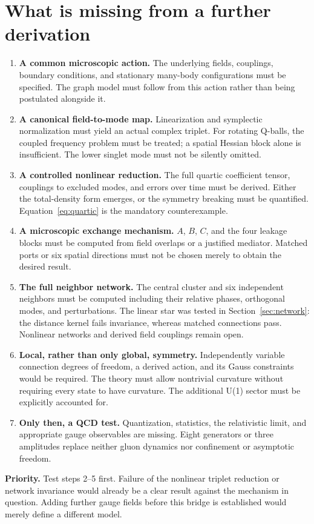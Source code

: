 \documentclass[a4paper,11pt]{article}
\begin{document}
\section{What is missing from a further derivation}\label{sec:missing}
\begin{enumerate}
\item \textbf{A common microscopic action.}
The underlying fields, couplings, boundary conditions, and stationary many-body configurations must be specified. The graph model must follow from this action rather than being postulated alongside it.
\item \textbf{A canonical field-to-mode map.}
Linearization and symplectic normalization must yield an actual complex triplet. For rotating Q-balls, the coupled frequency problem must be treated; a spatial Hessian block alone is insufficient. The lower singlet mode must not be silently omitted.
\item \textbf{A controlled nonlinear reduction.}
The full quartic coefficient tensor, couplings to excluded modes, and errors over time must be derived. Either the total-density form emerges, or the symmetry breaking must be quantified. Equation~\eqref{eq:quartic} is the mandatory counterexample.
\item \textbf{A microscopic exchange mechanism.}
$A$, $B$, $C$, and the four leakage blocks must be computed from field overlaps or a justified mediator. Matched ports or six spatial directions must not be chosen merely to obtain the desired result.
\item \textbf{The full neighbor network.}
The central cluster and six independent neighbors must be computed including their relative phases, orthogonal modes, and perturbations. The linear star was tested in Section~\ref{sec:network}: the distance kernel fails invariance, whereas matched connections pass. Nonlinear networks and derived field couplings remain open.
\item \textbf{Local, rather than only global, symmetry.}
Independently variable connection degrees of freedom, a derived action, and its Gauss constraints would be required. The theory must allow nontrivial curvature without requiring every state to have curvature. The additional U(1) sector must be explicitly accounted for.
\item \textbf{Only then, a QCD test.}
Quantization, statistics, the relativistic limit, and appropriate gauge observables are missing. Eight generators or three amplitudes replace neither gluon dynamics nor confinement or asymptotic freedom.
\end{enumerate}
\textbf{Priority.} Test steps 2--5 first. Failure of the nonlinear triplet reduction or network invariance would already be a clear result against the mechanism in question. Adding further gauge fields before this bridge is established would merely define a different model.
\end{document}
